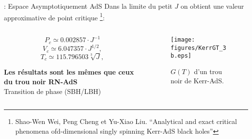 \begin{frame}{\underline{\secname} : Espace Asymptotiquement AdS}
	 Dans la limite du petit $J$ on obtient une valeur approximative de point critique \footnote{Shao-Wen Wei, Peng Cheng et Yu-Xiao Liu. “Analytical and exact critical phenomena ofd-dimensional singly spinning Kerr-AdS black holes”}:
	\begin{columns}
		\begin{column}{0.5\linewidth}
 	
			$$P_c \simeq  0.002857 \cdot J^{-1}$$
			$$V_c \simeq 6.047357 \cdot J^{1/2},$$
			$$T_c \simeq 115.796503 \sqrt[3]{J},$$

	\pause[3]		
	
	\begin{center}
		\textbf{Les résultats sont les mêmes que ceux du trou noir RN-AdS}	\\	
		{\color{green}Transition de phase (SBH/LBH)	}
	\end{center}

		\end{column}
		\begin{column}{0.5\linewidth}
			\pause[2]
	\begin{figure}[H]
		\begin{center}
			\texttt{[image: figures/KerrGT\_3b.eps]}
			\caption{ $G(T)$ d'un trou noir de Kerr-AdS.} \label{Fig:KKGT} 
		\end{center}
	\end{figure} 	
			
		\end{column}
	\end{columns}
\end{frame}



